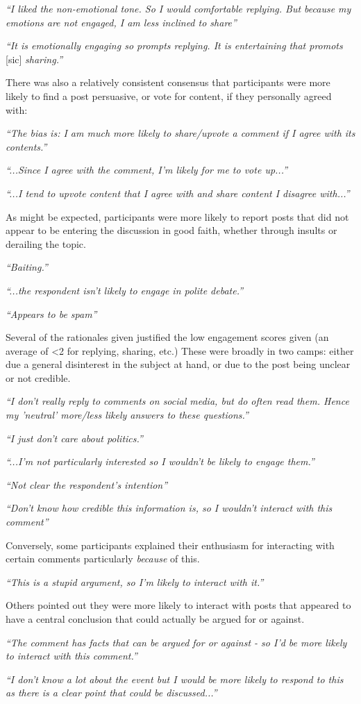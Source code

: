 \textit{``I liked the non-emotional tone. So I would comfortable replying. But because my emotions are not engaged, I am less inclined to share''}

\textit{``It is emotionally engaging so prompts replying. It is entertaining that promots} [sic] \textit{sharing.''} 

There was also a relatively consistent consensus that participants were more likely to find a post persuasive, or vote for content, if they personally agreed with:

\textit{``The bias is: I am much more likely to share/upvote a comment if I agree with its contents.''}

\textit{``...Since I agree with the comment, I'm likely for me to vote up...''}

\textit{``...I tend to upvote content that I agree with and share content I disagree with...''}

As might be expected, participants were more likely to report posts that did not appear to be entering the discussion in good faith, whether through insults or derailing the topic.

\textit{``Baiting.''}

\textit{``...the respondent isn't likely to engage in polite debate.''}

\textit{``Appears to be spam''}


Several of the rationales given justified the low engagement scores given (an average of \textless2 for replying, sharing, etc.) These were broadly in two camps: either due a general disinterest in the subject at hand, or due to the post being unclear or not credible.

\textit{``I don't really reply to comments on social media, but do often read them. Hence my 'neutral' more/less likely answers to these questions.''}

\textit{``I just don't care about politics.''}

\textit{``...I'm not particularly interested so I wouldn't be likely to engage them.''}

\textit{``Not clear the respondent's intention''}

\textit{``Don't know how credible this information is, so I wouldn't interact with this comment''}

Conversely, some participants explained their enthusiasm for interacting with certain comments particularly \textit{because} of this.

\textit{``This is a stupid argument, so I'm likely to interact with it.''}

Others pointed out they were more likely to interact with posts that appeared to have a central conclusion that could actually be argued for or against.

\textit{``The comment has facts that can be argued for or against - so I'd be more likely to interact with this comment.''}

\textit{``I don't know a lot about the event but I would be more likely to respond to this as there is a clear point that could be discussed...''}